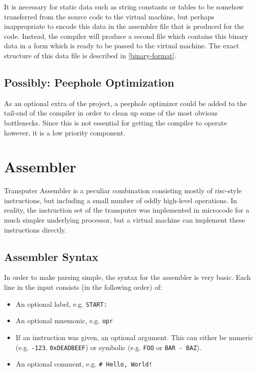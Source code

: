 It is necessary for static data such as string constants or tables to be somehow
transferred from the source code to the virtual machine, but perhaps
inappropriate to encode this data in the assembler file that is produced for the
code. Instead, the compiler will produce a second file which contains this
binary data in a form which is ready to be passed to the virtual machine. The
exact structure of this data file is described in \ref{binary-format}.

\subsection{Possibly: Peephole Optimization}

As an optional extra of the project, a peephole optimizer could be added to the
tail-end of the compiler in order to clean up some of the most obvious
bottlenecks. Since this is not essential for getting the compiler to operate
however, it is a low priority component.

\section{Assembler}

Transputer Assembler is a peculiar combination consisting mostly of
\gls{risc}-style instructions, but including a small number of oddly high-level
operations. In reality, the instruction set of the transputer was implemented in
microcode for a much simpler underlying processor, but a virtual machine can
implement these instructions directly.

\subsection{Assembler Syntax}

In order to make parsing simple, the syntax for the assembler is very basic.
Each line in the input consists (in the following order) of:
\begin{itemize}
  \item An optional label, e.g. \texttt{START:}
  \item An optional \gls{mnemonic}, e.g. \texttt{opr}
  \item If an instruction was given, an optional argument. This can either be
        numeric (e.g. \texttt{-123}, \texttt{0xDEADBEEF}) or symbolic
        (e.g. \texttt{FOO} or \texttt{BAR - BAZ}).
  \item An optional comment, e.g. \texttt{\# Hello, World!}
\end{itemize}


